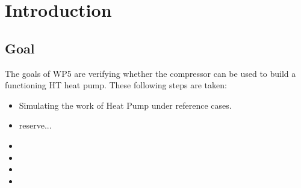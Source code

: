 \section{Introduction}
\subsection{Goal}

The goals of WP5 are verifying whether the compressor can be used to build a functioning HT heat pump. These following steps are taken:   

\begin{itemize}
    \item Simulating the work of Heat Pump under reference cases.
    \item reserve...
    \item
    \item
    \item
    \item
\end{itemize}
